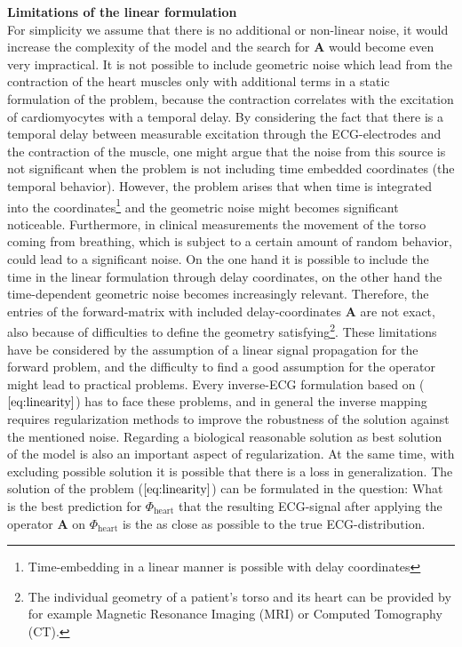 \textbf{Limitations of the linear formulation}\\
For simplicity we assume that there is no additional or non-linear noise, it would increase the complexity of the model and the search for $\textbf{A}$ would become even very impractical. It is not possible to include geometric noise which lead from the contraction of the heart muscles only with additional terms in a static formulation of the problem, because the contraction correlates with the excitation of cardiomyocytes with a temporal delay.
By considering the fact that there is a temporal delay between measurable excitation through the ECG-electrodes and the contraction of the muscle, one might argue that the noise from this source is not significant when the problem is not including time embedded coordinates (the temporal behavior). However, the problem arises that when time is integrated into the coordinates\footnote{Time-embedding in a linear manner is possible with delay coordinates} and the geometric noise might becomes significant noticeable.
Furthermore, in clinical measurements the movement of the torso coming from breathing, which is subject to a certain amount of random behavior, could lead to a significant noise. 
On the one hand it is possible to include the time in the linear formulation through delay coordinates, on the other hand the time-dependent geometric noise becomes increasingly relevant. Therefore, the entries of the forward-matrix with included delay-coordinates $\textbf{A}$ are not exact, also because of difficulties to define the geometry satisfying\footnote{The individual geometry of a patient's torso and its heart can be provided by for example Magnetic Resonance Imaging (MRI) or Computed Tomography (CT).}. These limitations have be considered by the assumption of a linear signal propagation for the forward problem, and the difficulty to find a good assumption for the operator might lead to practical problems. Every inverse-ECG formulation based on ($\ref{eq:linearity}$) has to face these problems, and in general the inverse mapping requires regularization methods to improve the robustness of the solution against the mentioned noise.
Regarding a biological reasonable solution as best solution of the model is also an important aspect of regularization. At the same time, with excluding possible solution it is possible that there is a loss in generalization. The solution of the problem ($\ref{eq:linearity}$) can be formulated in the question: What is the best prediction for $\varPhi_{\text{heart}}$ that the resulting ECG-signal after applying the operator $\textbf{A}$ on $\varPhi_{\text{heart}}$ is the as close as possible to the true ECG-distribution. 

